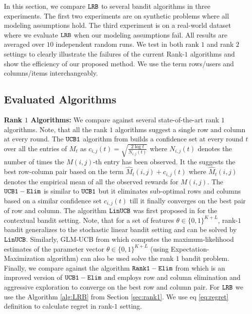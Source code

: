 In this section, we compare ${\tt LRB}$ to several bandit algorithms in three experiments. The first two experiments are on synthetic problems where all modeling assumptions hold. The third experiment is on a real-world dataset where we evaluate ${\tt LRB}$ when our modeling assumptions fail. All results are averaged over $10$ independent random runs. We test in both rank $1$ and rank $2$ settings to clearly illustrate the failures of the current Rank-$1$ algorithms and show the efficiency of our proposed method. We use the term rows/users and columns/items interchangeably. 

\subsection{Evaluated Algorithms}

\textbf{Rank $1$ Algorithms:} We compare against several state-of-the-art rank $1$ algorithms. Note, that  all the rank $1$ algorithms suggest a single row and column at every round. The ${\tt UCB1}$ algorithm from \citet{auer2002finite} builds a confidence set at every round $t$ over all the entries of $M_t$ as $c_{i, j}(t) = \sqrt{\frac{2\log t}{N_{i, j}(t)}}$ where $N_{i, j}(t)$ denotes the number of times the $M(i,j)$-th entry has been observed. It the suggests the best row-column pair based on the term $\hat{M}_{t}(i,j) + c_{i, j}(t)$ where $\hat{M}_{t}(i,j)$ denotes the empirical mean of all the observed rewards for $M(i,j)$. The ${\tt UCB1-Elim}$  \citep{auer2010ucb} is similar to ${\tt UCB1}$ but it eliminates sub-optimal rows and columns  based on a similar confidence set  $c_{i, j}(t)$ till it finally converges on the best pair of row and column. The algorithm ${\tt LinUCB}$ was first proposed in \citet{li2010contextual} for the contextual bandit setting. Note, that for a set of features $\theta \in \{0,1\}^{K+L}$, rank-$1$ bandit generalizes to the stochastic linear bandit setting and can be solved by ${\tt LinUCB}$.  Similarly, GLM-UCB from  \citet{filippi2010parametric} which computes the maximum-likelihood estimates of the parameter vector $\theta \in \{0,1\}^{K+L}$ (using Expectation-Maximization algorithm) can also be used solve the rank $1$ bandit problem. Finally, we compare against the algorithm $\tt Rank1-Elim$ from \citet{katariya2016stochastic} which is an improved version of ${\tt UCB1-Elim}$ and employs row and column elimination and aggressive exploration to converge on the best row and column pair. For ${\tt LRB}$ we use the Algorithm \ref{alg:LRB} from Section \ref{sec:rank1}. We use eq \eqref{eq:regret} definition to calculate regret in rank-$1$ setting.


